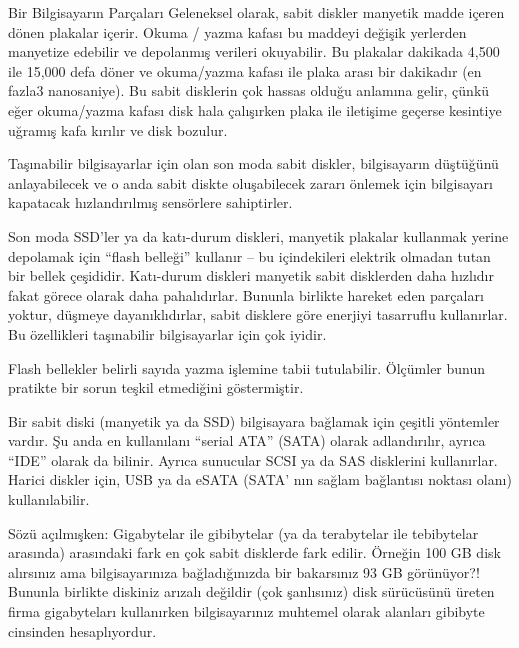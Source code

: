 \documentclass[10pt,a5paper]{book}
\begin{document}
\begin{section}{Bir Bilgisayarın Parçaları}
Geleneksel olarak, sabit diskler manyetik madde içeren dönen plakalar içerir. Okuma / yazma kafası bu maddeyi değişik yerlerden manyetize edebilir ve depolanmış verileri okuyabilir. Bu plakalar dakikada 4,500 ile 15,000 defa döner ve okuma/yazma kafası ile plaka arası bir dakikadır (en fazla3 nanosaniye). Bu sabit disklerin çok hassas olduğu anlamına gelir, çünkü eğer okuma/yazma kafası disk hala çalışırken plaka ile iletişime geçerse kesintiye uğramış kafa kırılır ve disk bozulur.

Taşınabilir bilgisayarlar için olan son moda sabit diskler, bilgisayarın düştüğünü anlayabilecek ve o anda sabit diskte oluşabilecek zararı önlemek için bilgisayarı kapatacak hızlandırılmış sensörlere sahiptirler.

Son moda SSD'ler ya da katı-durum diskleri, manyetik plakalar kullanmak yerine depolamak için “flash belleği” kullanır – bu içindekileri elektrik olmadan tutan bir bellek çeşididir. Katı-durum diskleri manyetik sabit disklerden daha hızlıdır fakat görece olarak daha pahalıdırlar. Bununla birlikte hareket eden parçaları yoktur, düşmeye dayanıklıdırlar, sabit disklere göre enerjiyi tasarruflu kullanırlar. Bu özellikleri taşınabilir bilgisayarlar için çok iyidir.

Flash bellekler belirli sayıda yazma işlemine tabii tutulabilir. Ölçümler bunun pratikte bir sorun teşkil etmediğini göstermiştir.

Bir sabit diski (manyetik ya da SSD) bilgisayara bağlamak için çeşitli yöntemler vardır. Şu anda en kullanılanı “serial ATA” (SATA) olarak adlandırılır, ayrıca “IDE” olarak da bilinir. Ayrıca sunucular SCSI ya da SAS disklerini kullanırlar. Harici diskler için, USB ya da eSATA (SATA' nın sağlam bağlantısı noktası olanı) kullanılabilir.

Sözü açılmışken: Gigabytelar ile gibibytelar (ya da terabytelar ile tebibytelar arasında) arasındaki fark en çok sabit disklerde fark edilir. Örneğin 100 GB disk alırsınız ama bilgisayarınıza bağladığınızda bir bakarsınız 93 GB görünüyor?! Bununla birlikte diskiniz arızalı değildir (çok şanlısınız) disk sürücüsünü üreten firma gigabyteları kullanırken bilgisayarınız muhtemel olarak alanları gibibyte cinsinden hesaplıyordur.

\end{section}
\end{document}
